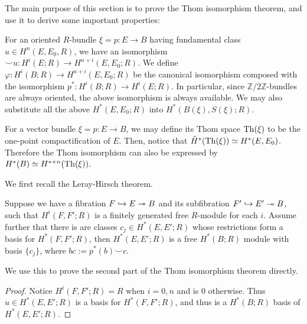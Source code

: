 	The main purpose of this section is to prove the Thom isomorphism theorem, and use it to derive some important properties: 
	\begin{thm} \label{Thom_isom}
		For an oriented $R$-bundle $\xi=p:E\to B$ having fundamental class $u\in H^n(E,E_0,R)$, we have an isomorphism $\smile u:H^i(E;R)\to H^{n+i}(E,E_0;R)$. We define $\varphi:H^i(B;R)\to H^{n+i}(E,E_0;R)$ be the canonical isomorphism composed with the isomorphism $p^*:H^i(B;R)\to H^i(E;R)$. In particular, since $\mathbb{Z}/2\mathbb{Z}$-bundles are always oriented, the above isomorphism is always available. We may also substitute all the above $H^*(E,E_0;R)$ into $H^*(B(\xi),S(\xi);R)$. 
	\end{thm}
	\begin{remark}
		For a vector bundle $\xi=p:E\to B$, we may define its Thom space $\operatorname{\mathrm{Th}}(\xi)$ to be the one-point compactification of $E$. Then, notice that $\tilde{H}^*(\operatorname{\mathrm{Th}}(\xi))\simeq H^*(E,E_0)$. Therefore the Thom isomorphism can also be expressed by $H^*(B)\simeq H^{*+n}(\operatorname{\mathrm{Th}}(\xi))$. 
	\end{remark}

	We first recall the Leray-Hirsch theorem. 
	\begin{thm} \label{Leray-Hirsch}
		Suppose we have a fibration $F\hookrightarrow E\twoheadrightarrow B$ and its subfibration $F'\hookrightarrow E'\twoheadrightarrow B$, such that $H^i(F,F';R)$ is a finitely generated free $R$-module for each $i$. Assume further that there is are classes $c_j\in H^*(E,E';R)$ whose restrictions form a basis for $H^*(F,F';R)$, then $H^*(E,E';R)$ is a free $H^*(B;R)$ module with basis $\{c_j\}$, where $bc:=p^*(b)\smile c$. 
	\end{thm}
	
	We use this to prove the second part of the Thom isomorphism theorem directly. 
	\begin{proof}
		Notice $H^i(F,F';R)=R$ when $i=0,n$ and is $0$ otherwise. Thus $u\in H^*(E,E';R)$ is a basis for $H^*(F,F';R)$, and thus is a $H^*(B;R)$ basis of $H^*(E,E';R)$. 
	\end{proof}

